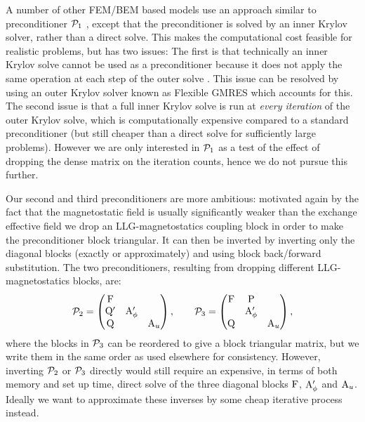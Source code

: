 A number of other FEM/BEM based models use an approach similar to preconditioner $\mathcal{P}_1$ \cite{Suess2002}, except that the preconditioner is solved by an inner Krylov solver, rather than a direct solve.
This makes the computational cost feasible for realistic problems, but has two issues:
The first is that technically an inner Krylov solve cannot be used as a preconditioner because it does not apply the same operation at each step of the outer solve \cite{Saad1993}.
This issue can be resolved by using an outer Krylov solver known as Flexible GMRES which accounts for this.
The second issue is that a full inner Krylov solve is run at \emph{every iteration} of the outer Krylov solve, which is computationally expensive compared to a standard preconditioner (but still cheaper than a direct solve for sufficiently large problems).
However we are only interested in $\mathcal{P}_1$ as a test of the effect of dropping the dense matrix on the iteration counts, hence we do not pursue this further.

Our second and third preconditioners are more ambitious: motivated again by the fact that the magnetostatic field is usually significantly weaker than the exchange effective field we drop an LLG-magnetostatics coupling block in order to make the preconditioner block triangular.
It can then be inverted by inverting only the diagonal blocks (exactly or approximately) and using block back/forward substitution.
The two preconditioners, resulting from dropping different LLG-magnetostatics blocks, are:
\begin{equation}
  \mathcal{P}_2 =
  \begin{pmatrix}
    \mathrm{F}       &           &  \\
    \mathrm{Q}'       & \mathrm{A}_\phi'&   \\
    \mathrm{Q}       &           &   \mathrm{A}_u
  \end{pmatrix},
  \qquad
  \mathcal{P}_3 =
  \begin{pmatrix}
    \mathrm{F}       & \mathrm{P}       &  \\
    & \mathrm{A}_\phi' &   \\
    \mathrm{Q}       &           &   \mathrm{A}_u
  \end{pmatrix},
  \label{eq:ms-block-prec-drop-p}
\end{equation}
where the blocks in $\mathcal{P}_3$ can be reordered to give a block triangular matrix, but we write them in the same order as used elsewhere for consistency.
However, inverting $\mathcal{P}_2$ or $\mathcal{P}_3$ directly would still require an expensive, in terms of both memory and set up time, direct solve of the three diagonal blocks $\mathrm{F}$, $\mathrm{A}_\phi'$ and $\mathrm{A}_u$.
Ideally we want to approximate these inverses by some cheap iterative process instead.

